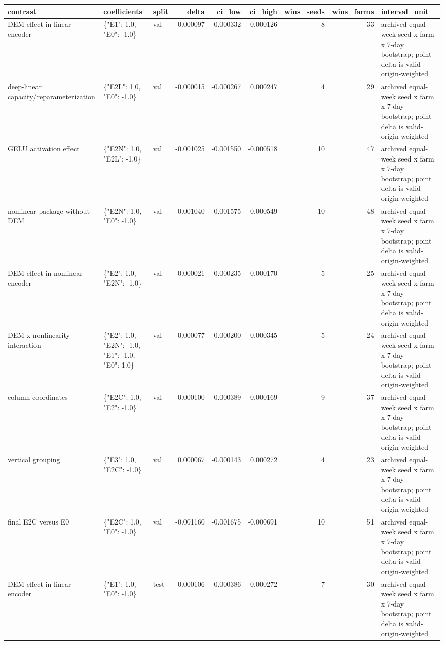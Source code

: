 \begin{tabular}{lllrrrrrl}
\toprule
contrast & coefficients & split & delta & ci\_low & ci\_high & wins\_seeds & wins\_farms & interval\_unit \\
\midrule
DEM effect in linear encoder & \{"E1": 1.0, "E0": -1.0\} & val & -0.000097 & -0.000332 & 0.000126 & 8 & 33 & archived equal-week seed x farm x 7-day bootstrap; point delta is valid-origin-weighted \\
deep-linear capacity/reparameterization & \{"E2L": 1.0, "E0": -1.0\} & val & -0.000015 & -0.000267 & 0.000247 & 4 & 29 & archived equal-week seed x farm x 7-day bootstrap; point delta is valid-origin-weighted \\
GELU activation effect & \{"E2N": 1.0, "E2L": -1.0\} & val & -0.001025 & -0.001550 & -0.000518 & 10 & 47 & archived equal-week seed x farm x 7-day bootstrap; point delta is valid-origin-weighted \\
nonlinear package without DEM & \{"E2N": 1.0, "E0": -1.0\} & val & -0.001040 & -0.001575 & -0.000549 & 10 & 48 & archived equal-week seed x farm x 7-day bootstrap; point delta is valid-origin-weighted \\
DEM effect in nonlinear encoder & \{"E2": 1.0, "E2N": -1.0\} & val & -0.000021 & -0.000235 & 0.000170 & 5 & 25 & archived equal-week seed x farm x 7-day bootstrap; point delta is valid-origin-weighted \\
DEM x nonlinearity interaction & \{"E2": 1.0, "E2N": -1.0, "E1": -1.0, "E0": 1.0\} & val & 0.000077 & -0.000200 & 0.000345 & 5 & 24 & archived equal-week seed x farm x 7-day bootstrap; point delta is valid-origin-weighted \\
column coordinates & \{"E2C": 1.0, "E2": -1.0\} & val & -0.000100 & -0.000389 & 0.000169 & 9 & 37 & archived equal-week seed x farm x 7-day bootstrap; point delta is valid-origin-weighted \\
vertical grouping & \{"E3": 1.0, "E2C": -1.0\} & val & 0.000067 & -0.000143 & 0.000272 & 4 & 23 & archived equal-week seed x farm x 7-day bootstrap; point delta is valid-origin-weighted \\
final E2C versus E0 & \{"E2C": 1.0, "E0": -1.0\} & val & -0.001160 & -0.001675 & -0.000691 & 10 & 51 & archived equal-week seed x farm x 7-day bootstrap; point delta is valid-origin-weighted \\
DEM effect in linear encoder & \{"E1": 1.0, "E0": -1.0\} & test & -0.000106 & -0.000386 & 0.000272 & 7 & 30 & archived equal-week seed x farm x 7-day bootstrap; point delta is valid-origin-weighted \\

\end{tabular}
